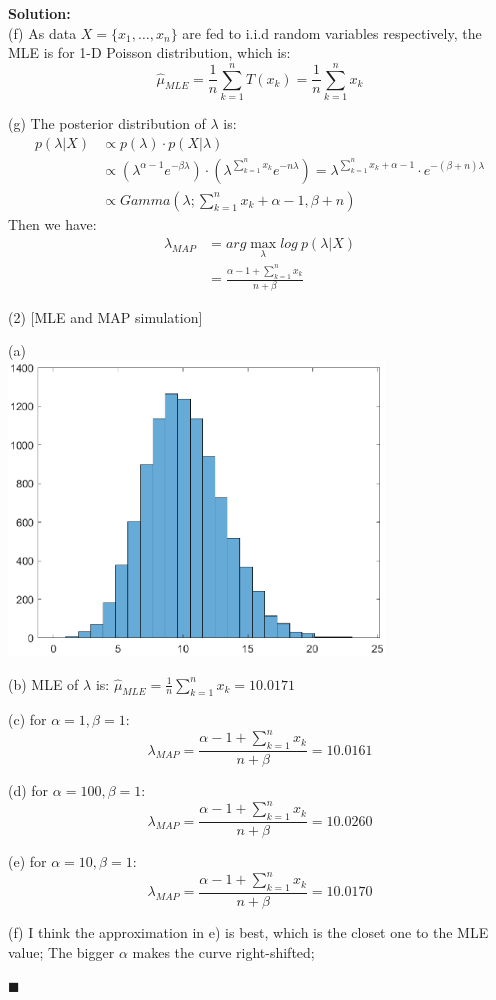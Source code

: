\documentclass{article}
\newenvironment{solution}                               %
{\textbf{Solution:} \\}{$\blacksquare$\newline}         %
\begin{document}
\begin{solution}
        (f) As data $X=\{x_1, \dots, x_n\}$ are fed to i.i.d random variables respectively,
        the MLE is for 1-D Poisson distribution, which is:
        $$
        \hat{\mu}_{MLE} = \frac{1}{n} \sum\limits_{k=1}^{n} T(x_k) = \frac{1}{n} \sum\limits_{k=1}^{n} x_k
        $$

        (g) The posterior distribution of $\lambda$ is:
        \begin{align*}
            p(\lambda | X) &\propto p(\lambda) \cdot p(X|\lambda) \\
            &\propto
                (\lambda^{\alpha -1} e^{-\beta \lambda}) \cdot
                (\lambda^{\sum_{k=1}^{n} x_k} e^{-n\lambda})
             = \lambda^{\sum_{k=1}^{n} x_k + \alpha -1} \cdot e^{-(\beta+n) \lambda} \\
            &\propto Gamma(\lambda;\sum_{k=1}^{n} x_k + \alpha -1, \beta+n)
        \end{align*}
        Then we have:
        \begin{align*}
            \lambda_{MAP} &= arg\max_{\lambda}log\ p(\lambda | X) \\
            &= \frac{\alpha - 1 + \sum_{k=1}^{n} x_k}{n + \beta}
        \end{align*}

        (2) [MLE and MAP simulation]

        (a) \\
        \includegraphics[width=0.75\textwidth]{images/a1_histo.eps}
        
        (b) MLE of $\lambda$ is: 
        $\hat{\mu}_{MLE} = \frac{1}{n} \sum\limits_{k=1}^{n} x_k = 10.0171$

        (c) for $\alpha=1, \beta=1$:
        $$
        \lambda_{MAP} = \frac{\alpha - 1 + \sum_{k=1}^{n} x_k}{n + \beta} = 10.0161
        $$

        (d) for $\alpha=100, \beta=1$:
        $$
        \lambda_{MAP} = \frac{\alpha - 1 + \sum_{k=1}^{n} x_k}{n + \beta} = 10.0260
        $$

        (e) for $\alpha=10, \beta=1$:
        $$
        \lambda_{MAP} = \frac{\alpha - 1 + \sum_{k=1}^{n} x_k}{n + \beta} = 10.0170
        $$

        (f) I think the approximation in e) is best, which is the closet one to the MLE value; 
        The bigger $\alpha$ makes the curve right-shifted;

    \end{solution}
\end{document}
